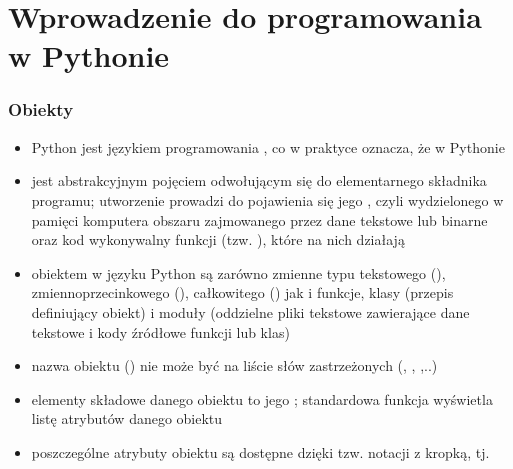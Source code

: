 \section{Wprowadzenie do programowania w Pythonie}


\begin{frame}
\frametitle{Obiekty}

\begin{itemize}\scriptsize

 \item Python jest językiem programowania , co w
 praktyce oznacza, że w Pythonie 

 \item {} jest abstrakcyjnym pojęciem odwołującym się do
 elementarnego składnika programu; utworzenie  prowadzi
 do pojawienia się jego , czyli wydzielonego w pamięci
 komputera obszaru zajmowanego przez dane tekstowe lub binarne oraz
 kod wykonywalny funkcji (tzw. ), które na nich działają

 \item obiektem w języku Python są zarówno zmienne typu tekstowego
 (), zmiennoprzecinkowego (), całkowitego
 () jak i funkcje, klasy (przepis definiujący obiekt) i
 moduły (oddzielne pliki tekstowe zawierające dane tekstowe i kody
 źródłowe funkcji lub klas)


 \item nazwa obiektu
 () nie może być
 na liście słów zastrzeżonych (, ,
 ,..)


 \item elementy składowe danego obiektu to jego ;
 standardowa funkcja  wyświetla listę atrybutów danego
 obiektu

 \item poszczególne atrybuty obiektu są dostępne dzięki tzw. notacji z
 kropką, tj. 

\end{itemize}
\end{frame}


